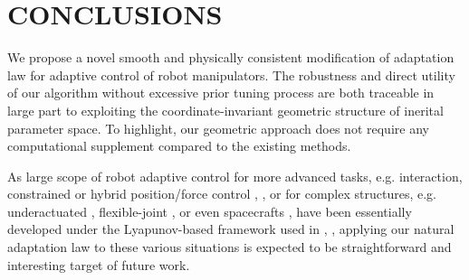 \documentclass[letterpaper, 10 pt, conference]{ieeeconf}  %
\begin{document}

\section{CONCLUSIONS}
We propose a novel smooth and physically consistent modification of adaptation law for adaptive control of robot manipulators. The robustness and direct utility of our algorithm without excessive prior tuning process are both traceable in large part to exploiting the coordinate-invariant geometric structure of inerital parameter space. To highlight, our geometric approach does not require any computational supplement compared to the existing methods.

As large scope of robot adaptive control for more advanced tasks, e.g. interaction, constrained or hybrid position/force control \cite{AC_interaction}, \cite{AC_constrained}, or for complex structures, e.g. underactuated \cite{AC_underactuated}, flexible-joint \cite{AC_flexible}, or even spacecrafts \cite{AC_spacecraft}, have been essentially developed under the Lyapunov-based framework used in \cite{Craig_AdaptiveControl}, \cite{Slotine_AdaptiveControl}, applying our natural adaptation law to these various situations is expected to be straightforward and interesting target of future work.
\end{document}
